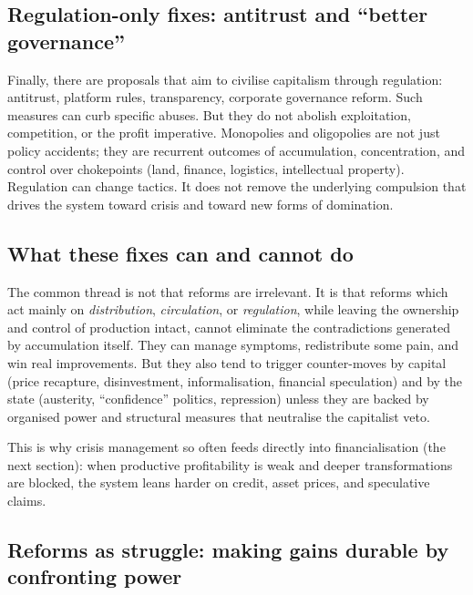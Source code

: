 \subsection{Regulation-only fixes: antitrust and ``better governance''}
\label{sec:policy-regulation-only}

Finally, there are proposals that aim to civilise capitalism through regulation: antitrust, platform rules, transparency,
corporate governance reform. Such measures can curb specific abuses. But they do not abolish exploitation, competition, or
the profit imperative. Monopolies and oligopolies are not just policy accidents; they are recurrent outcomes of accumulation,
concentration, and control over chokepoints (land, finance, logistics, intellectual property). Regulation can change tactics.
It does not remove the underlying compulsion that drives the system toward crisis and toward new forms of domination.

\subsection{What these fixes can and cannot do}
\label{sec:policy-general-point}

The common thread is not that reforms are irrelevant. It is that reforms which act mainly on \emph{distribution},
\emph{circulation}, or \emph{regulation}, while leaving the ownership and control of production intact, cannot eliminate the
contradictions generated by accumulation itself. They can manage symptoms, redistribute some pain, and win real improvements.
But they also tend to trigger counter-moves by capital (price recapture, disinvestment, informalisation, financial speculation)
and by the state (austerity, ``confidence'' politics, repression) unless they are backed by organised power and structural
measures that neutralise the capitalist veto.

This is why crisis management so often feeds directly into financialisation (the next section): when productive profitability
is weak and deeper transformations are blocked, the system leans harder on credit, asset prices, and speculative claims.

\subsection{Reforms as struggle: making gains durable by confronting power}
\label{sec:reforms-as-struggle}

